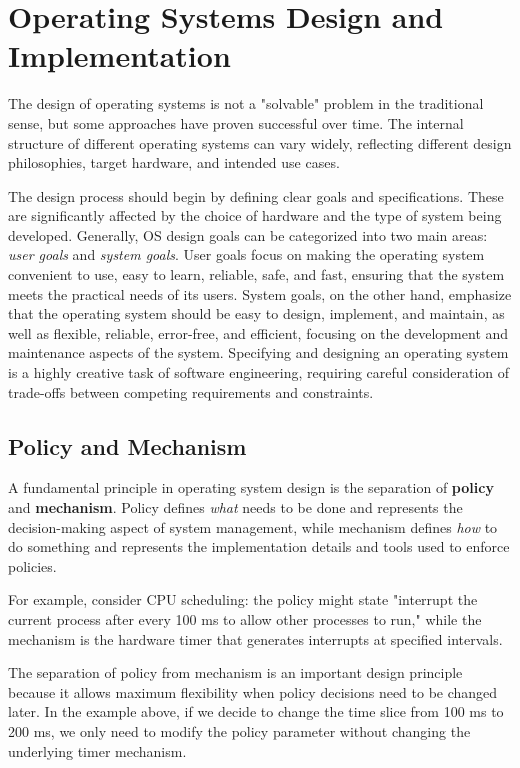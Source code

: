 \section{Operating Systems Design and Implementation}

    The design of operating systems is not a "solvable" problem in the traditional sense, but some approaches have proven successful over time. The internal structure of different operating systems can vary widely, reflecting different design philosophies, target hardware, and intended use cases.
    
    The design process should begin by defining clear goals and specifications. These are significantly affected by the choice of hardware and the type of system being developed. Generally, OS design goals can be categorized into two main areas: \emph{user goals}  and \emph{system goals}. User goals focus on making the operating system convenient to use, easy to learn, reliable, safe, and fast, ensuring that the system meets the practical needs of its users. System goals, on the other hand, emphasize that the operating system should be easy to design, implement, and maintain, as well as flexible, reliable, error-free, and efficient, focusing on the development and maintenance aspects of the system.
    Specifying and designing an operating system is a highly creative task of software engineering, requiring careful consideration of trade-offs between competing requirements and constraints.


\subsection{Policy and Mechanism}

    A fundamental principle in operating system design is the separation of \textbf{policy} and \textbf{mechanism}. Policy defines \emph{what} needs to be done and represents the decision-making aspect of system management, while mechanism defines \emph{how} to do something and represents the implementation details and tools used to enforce policies.
    
    For example, consider CPU scheduling: the policy might state "interrupt the current process after every 100 ms to allow other processes to run," while the mechanism is the hardware timer that generates interrupts at specified intervals.
    
    The separation of policy from mechanism is an important design principle because it allows maximum flexibility when policy decisions need to be changed later. In the example above, if we decide to change the time slice from 100 ms to 200 ms, we only need to modify the policy parameter without changing the underlying timer mechanism.
    
